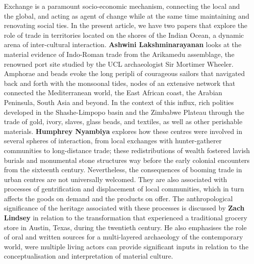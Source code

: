 Exchange is a paramount socio-economic mechanism, connecting the local and the global, and acting as agent of change while at the same time maintaining and renovating social ties. In the present article, we have two papers that explore the role of trade in territories located on the shores of the Indian Ocean, a dynamic arena of inter-cultural interaction. \textbf{Ashwini Lakshminarayanan} looks at the material evidence of Indo-Roman trade from the Arikamedu assemblage, the renowned port site studied by the UCL archaeologist Sir Mortimer Wheeler. Amphorae and beads evoke the long peripli of courageous sailors that navigated back and forth with the monsoonal tides, nodes of an extensive network that connected the Mediterranean world, the East African coast, the Arabian Peninsula, South Asia and beyond. In the context of this influx, rich polities developed in the Shashe-Limpopo basin and the Zimbabwe Plateau through the trade of gold, ivory, slaves, glass beads, and textiles, as well as other perishable materials.
\textbf{Humphrey Nyambiya} explores how these centres were involved in several spheres of interaction, from local exchanges with hunter-gatherer communities to long-distance trade; these redistributions of wealth fostered lavish burials and monumental stone structures way before the early colonial encounters from the sixteenth century. Nevertheless, the consequences of booming trade in urban centres are not universally welcomed. They are also associated with processes of gentrification and displacement of local communities, which in turn affects the goods on demand and the products on offer. The anthropological significance of the heritage associated with these processes is discussed by \textbf{Zach Lindsey} in relation to the transformation that experienced a traditional grocery store in Austin, Texas, during the twentieth century. He also emphasises the role of oral and written sources for a multi-layered archaeology of the contemporary world, were multiple living actors can provide significant inputs in relation to the conceptualisation and interpretation of material culture.

